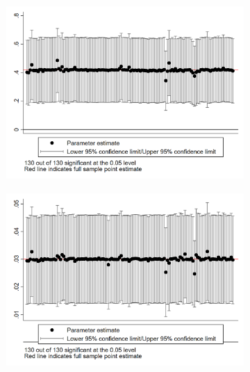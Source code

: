 \documentclass{article}
\begin{document}
\begin{figure}[htbp]
\begin{subfigure}{0.3\textwidth}
        \includegraphics[width=\linewidth]{exhibits/figures/exogeneity_tests/loo_iv_schdist_ind.png}
        \label{fig:sub3}
    \end{subfigure}
    \begin{subfigure}{0.3\textwidth}
        \includegraphics[width=\linewidth]{exhibits/figures/exogeneity_tests/loo_iv_gen_town.png}
        \label{fig:sub5}
    \end{subfigure}
    \begin{subfigure}{0.3\textwidth}

\end{subfigure}
\end{figure}
\end{document}
